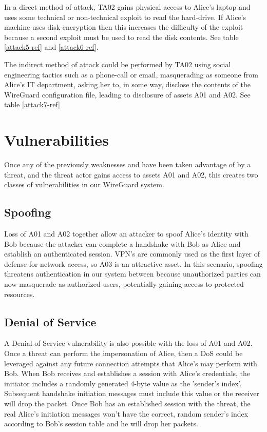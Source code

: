\documentclass [11pt, proquest] {uwthesis}[2020/02/24]
\begin{document}
In a direct method of attack, TA02 gains physical access to Alice's laptop and uses some technical or non-technical exploit to read the hard-drive. If Alice's machine uses disk-encryption then this increases the difficulty of the exploit because a second exploit must be used to read the disk contents.
See table \ref{attack5-ref} and \ref{attack6-ref}.

The indirect method of attack could be performed by TA02 using social engineering tactics such as a phone-call or email, masquerading as someone from Alice's IT department, asking her to, in some way, disclose the contents of the WireGuard configuration file, leading to disclosure of assets A01 and A02.
See table \ref{attack7-ref} 

\section{Vulnerabilities}
Once any of the previously weaknesses and have been taken advantage of by a threat, and the threat actor gains access to assets A01 and A02, this creates two classes of vulnerabilities in our WireGuard system.

\subsection{Spoofing}
\label{spoofing}
Loss of A01 and A02 together allow an attacker to spoof Alice's identity with Bob because the attacker can complete a handshake with Bob as Alice and establish an authenticated session. VPN's are commonly used as the first layer of defense for network access, so A03 is an attractive asset.
In this scenario, spoofing threatens authentication in our system between because unauthorized parties can now masquerade as authorized users, potentially gaining access to protected resources. 

\subsection{Denial of Service}
\label{dos}
A Denial of Service vulnerability is also possible with the loss of A01 and A02. Once a threat can perform the impersonation of Alice, then a DoS could be leveraged against any future connection attempts that Alice's may perform with Bob. When Bob receives and establishes a session with Alice's credentials, the initiator includes a randomly generated 4-byte value as the 'sender's index'. Subsequent handshake initiation messages must include this value or the receiver will drop the packet. Once Bob has an established session with the threat, the real Alice's initiation messages won't have the correct, random sender's index according to Bob's session table and he will drop her packets.
\end{document}
